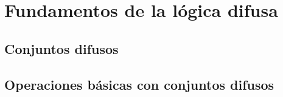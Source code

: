 \section{Fundamentos de la lógica difusa}

\subsection{Conjuntos difusos}

\subsection{Operaciones básicas con conjuntos difusos}

